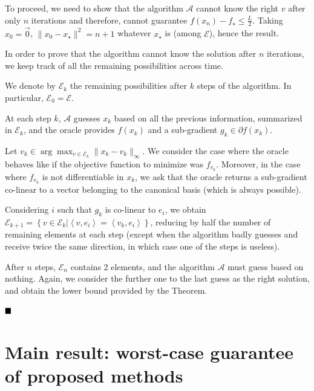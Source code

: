             To proceed, we need to show that the algorithm $\mathcal{A}$ cannot know the right $v$ after only $n$ iterations and therefore, cannot guarantee $f(x_n) - f_\star \leq \frac{L}{2}$.
            Taking $x_0 = \Vec{0}$, $\|x_0 - x_\star \|^2 = n+1$ whatever $x_\star$ is (among $\mathcal{E}$), hence the result.
            
            In order to prove that the algorithm cannot know the solution after $n$ iterations, we keep track of all the remaining possibilities across time.
            
            We denote by $\mathcal{E}_k$ the remaining possibilities after $k$ steps of the algorithm.
            In particular, $\mathcal{E}_0=\mathcal{E}$.
            
            At each step $k$, $\mathcal{A}$ guesses $x_k$ based on all the previous information, summarized in $\mathcal{E}_k$, and the oracle provides $f(x_k)$ and a sub-gradient $g_k \in \partial f(x_k)$.
            
            Let $v_k \in \arg\max_{v \in \mathcal{E}_k} \|x_k - v_k\|_\infty$.
            We consider the case where the oracle behaves like if the objective function to minimize was $f_{v_k}$.
            Moreover, in the case where $f_{v_k}$ is not differentiable in $x_k$, we ask that the oracle returns a sub-gradient co-linear to a vector belonging to the canonical basis (which is always possible).
            
            Considering $i$ such that $g_k$ is co-linear to $e_i$, we obtain
            $\mathcal{E}_{k+1} = \left\{ v \in \mathcal{E}_k | \left< v, e_i \right> = \left< v_k, e_i \right> \right\}$, reducing by half the number of remaining elements at each step (except when the algorithm badly guesses and receive twice the same direction, in which case one of the steps is useless).
            
            After $n$ steps, $\mathcal{E}_{n}$ contains 2 elements, and the algorithm $\mathcal{A}$ must guess based on nothing.
            Again, we consider the further one to the last guess as the right solution, and obtain the lower bound provided by the Theorem.
            
        $\hfill\blacksquare$

\section{Main result: worst-case guarantee of proposed methods}
\label{apx:main_result}


